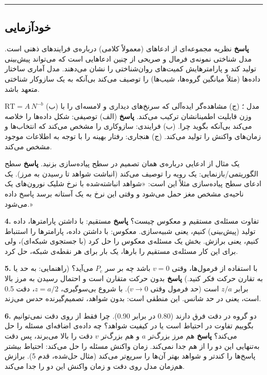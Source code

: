 \begin{center}\rule{0.5\linewidth}{0.5pt}\end{center}

\subsection{خودآزمایی}

\textbf{پاسخ} نظریه مجموعه‌ای از ادعاهای (معمولاً کلامی) درباره‌ی فرایندهای
ذهنی است. مدل شناختی نمونه‌ی فرمال و صریحی از چنین ادعاهایی است که
می‌تواند پیش‌بینی تولید کند و پارامترهایش کمیت‌های روان‌شناختی را نشان
می‌دهند. مدل آماری ساختار داده‌ها (مثلاً میانگین گروه‌ها، شیب‌ها) را توصیف
می‌کند بی‌آنکه به یک سازوکار شناختی متعهد باشد.

\(\mathrm{RT} = A\,N^{-b}\) (ب) مدل ؛ (ج) مشاهده‌گر
ایده‌آلی که سرنخ‌های دیداری و لامسه‌ای را با وزن قابلیت اطمینانشان ترکیب
می‌کند. \textbf{پاسخ} (الف) توصیفی: شکل داده‌ها را خلاصه می‌کند بی‌آنکه
بگوید چرا. (ب) فرایندی: سازوکاری را مشخص می‌کند که انتخاب‌ها و زمان‌های
واکنش را تولید می‌کند. (ج) هنجاری: رفتار بهینه را با توجه به اطلاعات
موجود مشخص می‌کند.

یک مثال از ادعایی درباره‌ی همان تصمیم در سطح پیاده‌سازی بزنید.
\textbf{پاسخ} سطح الگوریتمی/بازنمایی: یک رویه را توصیف می‌کند (انباشت
شواهد تا رسیدن به مرز). یک ادعای سطح پیاده‌سازی مثلاً این است: «شواهد
انباشته‌شده با نرخ شلیک نورون‌های یک ناحیه‌ی مشخص مغز حمل می‌شود و وقتی این
نرخ به یک آستانه برسد پاسخ داده می‌شود.»

\textbf{4.} تفاوت مسئله‌ی مستقیم و معکوس چیست؟ \textbf{پاسخ} مستقیم: با
داشتن پارامترها، داده تولید (پیش‌بینی) کنیم، یعنی شبیه‌سازی. معکوس: با
داشتن داده، پارامترها را استنباط کنیم، یعنی برازش. بخش  یک مسئله‌ی
معکوس را حل کرد (با جستجوی شبکه‌ای)، ولی برای این کار مسئله‌ی مستقیم را
بارها، یک بار برای هر نقطه‌ی شبکه، حل کرد.

\textbf{5.} با استفاده از فرمول‌ها، وقتی \(v = 0\) باشد چه بر سر \(P_c\)
می‌آید؟ (راهنمایی: به حد یا به تقارن حرکت فکر کنید.) \textbf{پاسخ} بدون
 حرکت متقارن است و احتمال رسیدن به مرز بالا برابر \(z/a\) است
(حد فرمول وقتی \(v \to 0\)). با شروع بی‌سوگیری، \(z = a/2\)، دقت 0.5 است،
یعنی در حد شانس. این منطقی است: بدون شواهد، تصمیم‌گیرنده حدس می‌زند.

\textbf{6.} دو گروه در دقت فرق دارند (0.80 در برابر 0.90). چرا فقط از
روی دقت نمی‌توانیم بگوییم تفاوت در احتیاط است یا در کیفیت شواهد؟ چه داده‌ی
اضافه‌ای مسئله را حل می‌کند؟ \textbf{پاسخ} هم مرز بزرگ‌تر \(a\) و هم
 بزرگ‌تر \(v\) دقت را بالا می‌برند، پس دقت به‌تنهایی این دو را از
هم جدا نمی‌کند. زمان واکنش مسئله را حل می‌کند: احتیاط بیشتر پاسخ‌ها را
کندتر و شواهد بهتر آن‌ها را سریع‌تر می‌کند (مثال حل‌شده، قدم 5). برازش
هم‌زمان مدل روی دقت و زمان واکنش این دو را جدا می‌کند.

